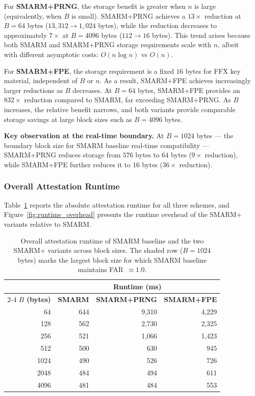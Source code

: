 \documentclass[a4paper,10pt]{article}
\begin{document}
{For \textbf{SMARM+PRNG}, the storage benefit is 
greater when $n$ is large (equivalently, when $B$ is small). 
SMARM+PRNG achieves a $13\times$ reduction at 
$B = 64$ bytes ($13{,}312 \rightarrow 1{,}024$ bytes), while the 
reduction decreases to approximately $7\times$ at $B = 4096$ 
bytes ($112 \rightarrow 16$ bytes). This trend arises because 
both SMARM and SMARM+PRNG storage requirements 
scale with $n$, albeit with different asymptotic costs: 
$O(n \log n)$ vs $O(n)$.

For \textbf{SMARM+FPE}, the storage requirement 
is a fixed $16$ bytes for FFX key material, independent of $B$ 
or $n$. As a result, SMARM+FPE achieves 
increasingly larger reductions as $B$ decreases. At $B = 64$ 
bytes, SMARM+FPE provides an $832\times$ 
reduction compared to SMARM, far exceeding 
SMARM+PRNG. As $B$ increases, the relative 
benefit narrows, and both variants provide comparable storage 
savings at large block sizes such as $B = 4096$ bytes.

\textbf{Key observation at the real-time boundary.} At $B = 
1024$ bytes — the boundary block size for SMARM baseline 
real-time compatibility — SMARM+PRNG reduces 
storage from $576$ bytes to $64$ bytes ($9\times$ reduction), 
while SMARM+FPE further reduces it to $16$ 
bytes ($36\times$ reduction).

\subsubsection{Overall Attestation Runtime}
\label{sec:smarmplus-runtime-eval}

Table~\ref{tab:runtime_overhead} reports the absolute attestation 
runtime for all three schemes, and 
Figure~\ref{fig:runtime_overhead} presents the runtime overhead 
of the SMARM+ variants relative to SMARM.

\begin{table}[H]
\centering
\caption{Overall attestation runtime of SMARM baseline and the 
two SMARM+ variants across block sizes. The shaded row 
($B = 1024$ bytes) marks the largest block size for which SMARM 
baseline maintains FAR~$\approx 1.0$.}
\label{tab:runtime_overhead}
\begin{tabular}{rrrr}
\toprule
& \multicolumn{3}{c}{\textbf{Runtime (ms)}} \\
\cmidrule(lr){2-4}
\textbf{$B$ (bytes)} 
& \textbf{SMARM} 
& \textbf{SMARM+PRNG} 
& \textbf{SMARM+FPE} \\
\midrule
64    & 644 & 9{,}310 & 4{,}229 \\
128   & 562 & 2{,}730 & 2{,}325 \\
256   & 521 & 1{,}066 & 1{,}423 \\
512   & 500 &   630   &   945   \\
\rowcolor{gray!15}
1024  & 490 &   526   &   726   \\
2048  & 484 &   494   &   611   \\
4096  & 481 &   484   &   553   \\
\bottomrule
\end{tabular}
\end{table}

}
\end{document}
